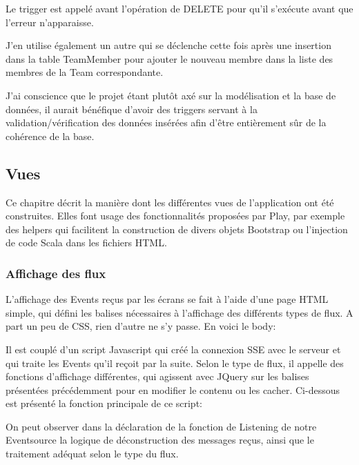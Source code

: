 \documentclass[french]{article}
\begin{document}


Le trigger est appelé avant l'opération de DELETE pour qu'il s'exécute avant que l'erreur n'apparaisse. 

J'en utilise également un autre qui se déclenche cette fois après une insertion dans la table TeamMember pour ajouter le nouveau membre dans la liste des membres de la Team correspondante.\newline

J'ai conscience que le projet étant plutôt axé sur la modélisation et la base de données, il aurait bénéfique d'avoir des triggers servant à la validation/vérification des données insérées afin d'être entièrement sûr de la cohérence de la base.

\newpage
\subsection{Vues}

Ce chapitre décrit la manière dont les différentes vues de l'application ont été construites. Elles font usage des fonctionnalités proposées par Play, par exemple des helpers qui facilitent la construction de divers objets Bootstrap ou l'injection de code Scala dans les fichiers HTML.

\subsubsection{Affichage des flux}

L'affichage des Events reçus par les écrans se fait à l'aide d'une page HTML simple, qui défini les balises nécessaires à l'affichage des différents types de flux. A part un peu de CSS, rien d'autre ne s'y passe. En voici le body:



Il est couplé d'un script Javascript qui créé la connexion SSE avec le serveur et qui traite les Events qu'il reçoit par la suite. Selon le type de flux, il appelle des fonctions d'affichage différentes, qui agissent avec JQuery sur les balises présentées précédemment pour en modifier le contenu ou les cacher. Ci-dessous est présenté la fonction principale de ce script:



On peut observer dans la déclaration de la fonction de Listening de notre Eventsource la logique de déconstruction des messages reçus, ainsi que le traitement adéquat selon le type du flux.
\end{document}

